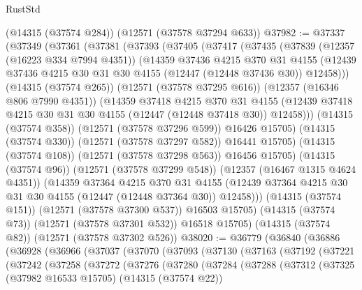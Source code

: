 \begin{lexlean}{RustStd}
\begin{coremodule}
    (@14315 (@37574 @284))
    (@12571 (@37578 @37294 @633))
@37982 := @37337
    (@37349
      (@37361
        (@37381
          (@37393
            (@37405
              (@37417
                (@37435
                  (@37839
                    (@12357 (@16223 @334 @7994 @4351))
                    (@14359
                      @37436
                      @4215
                      @370
                      @31
                      @4155
                      (@12439 @37436 @4215 @30 @31 @30 @4155 (@12447 (@12448 @37436 @30)) @12458)))
                  (@14315 (@37574 @265))
                  (@12571 (@37578 @37295 @616))
                  (@12357 (@16346 @806 @7990 @4351))
                  (@14359
                    @37418
                    @4215
                    @370
                    @31
                    @4155
                    (@12439 @37418 @4215 @30 @31 @30 @4155 (@12447 (@12448 @37418 @30)) @12458)))
                (@14315 (@37574 @358))
                (@12571 (@37578 @37296 @599))
                @16426
                @15705)
              (@14315 (@37574 @330))
              (@12571 (@37578 @37297 @582))
              @16441
              @15705)
            (@14315 (@37574 @108))
            (@12571 (@37578 @37298 @563))
            @16456
            @15705)
          (@14315 (@37574 @96))
          (@12571 (@37578 @37299 @548))
          (@12357 (@16467 @1315 @4624 @4351))
          (@14359
            @37364
            @4215
            @370
            @31
            @4155
            (@12439 @37364 @4215 @30 @31 @30 @4155 (@12447 (@12448 @37364 @30)) @12458)))
        (@14315 (@37574 @151))
        (@12571 (@37578 @37300 @537))
        @16503
        @15705)
      (@14315 (@37574 @73))
      (@12571 (@37578 @37301 @532))
      @16518
      @15705)
    (@14315 (@37574 @82))
    (@12571 (@37578 @37302 @526))
@38020 := @36779
    (@36840
      (@36886
        (@36928
          (@36966
            (@37037
              (@37070
                (@37093
                  (@37130
                    (@37163
                      (@37192
                        (@37221
                          (@37242
                            (@37258
                              (@37272
                                (@37276
                                  (@37280
                                    (@37284
                                      (@37288
                                        (@37312
                                          (@37325
                                            (@37982 @16533 @15705)
                                            (@14315 (@37574 @22))

\end{coremodule}
\end{lexlean}
